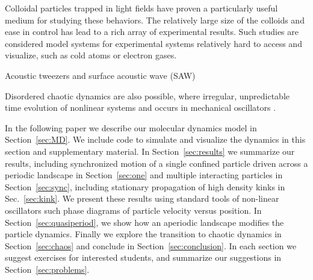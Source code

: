 \documentclass[prb,preprint]{revtex4}
\begin{document}
Colloidal particles trapped in light fields have proven
a particularly useful medium for studying these behaviors.  %
The relatively large size of the colloids
and ease in control has lead to a rich array of 
experimental results. %
Such studies are considered model systems
for experimental systems relatively hard to access and visualize,
such as cold atoms or electron gases. %

Acoustic tweezers and surface acoustic wave (SAW) \cite{}


Disordered chaotic dynamics are also possible,
where irregular, unpredictable time evolution of
nonlinear systems and occurs in mechanical oscillators \cite{chaos}.

In the following paper we describe
our molecular dynamics model in Section~\ref{sec:MD}.
We include code to simulate
and visualize the dynamics in this section
and supplementary material.
In Section~\ref{sec:results} we summarize
our results,
including synchronized motion of a single confined particle
driven across a periodic landscape in 
Section~\ref{sec:one} and
multiple interacting particles
in Section~\ref{sec:sync},
including stationary propagation of high density kinks
in Sec.~\ref{sec:kink}.
We present these results using standard tools of non-linear oscillators
such phase diagrams of particle velocity versus position.
In Section~\ref{sec:quasiperiod},
we show how an aperiodic landscape modifies the particle dynamics.
Finally we explore the transition to chaotic dynamics in 
Section~\ref{sec:chaos}
and conclude 
in Section~\ref{sec:conclusion}. 
In each section
we suggest exercises for interested students,
and summarize our suggestions in Section~\ref{sec:problems}.
\end{document}
